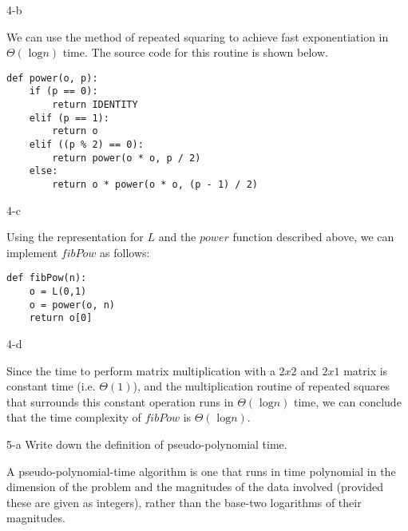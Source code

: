 \documentclass[11pt]{article}
\newcommand{\tlog}{\text{ log}}
\begin{document}
\begin{prob}{4-b}
\end{prob}
\begin{sol}

We can use the method of repeated squaring to achieve fast exponentiation in $\Theta(\tlog n)$ time. The source code for this routine is shown below.
\begin{lstlisting}
def power(o, p):
	if (p == 0):
		return IDENTITY
	elif (p == 1):
		return o
	elif ((p % 2) == 0):
		return power(o * o, p / 2)
	else:
		return o * power(o * o, (p - 1) / 2)
\end{lstlisting}
\end{sol}

\begin{prob}{4-c}
\end{prob}
\begin{sol}

Using the representation for $L$ and the $power$ function described above, we can implement $fibPow$ as follows:
\begin{lstlisting}
def fibPow(n):
	o = L(0,1)
	o = power(o, n)
	return o[0]
\end{lstlisting}
\end{sol}

\begin{prob}{4-d}
\end{prob}
\begin{sol}

Since the time to perform matrix multiplication with a $2x2$ and $2x1$ matrix is constant time (i.e. $\Theta(1)$), and the multiplication routine of repeated squares that surrounds this constant operation runs in $\Theta(\tlog n)$ time, we can conclude that the time complexity of $fibPow$ is $\Theta(\tlog n)$.
\end{sol}

\begin{prob}{5-a}
Write down the definition of pseudo-polynomial time.
\end{prob}
\begin{sol}
\begin{define}
A pseudo-polynomial-time algorithm is one that runs in time polynomial in the dimension of the problem and the magnitudes of the data involved (provided these are given as integers), rather than the base-two logarithms of their magnitudes.
\end{define}
\end{sol}
\end{document}
